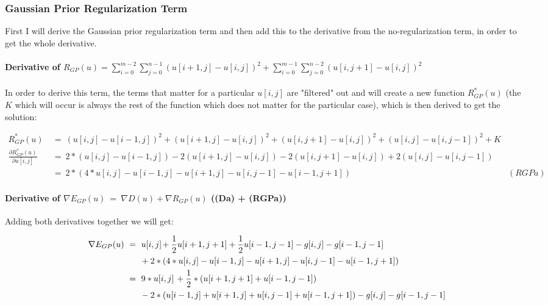 \documentclass{report}
\begin{document}
			\subsubsection{Gaussian Prior Regularization Term}
			\startsubsection
				First I will derive the Gaussian prior regularization term and then add this to the derivative from the no-regularization term, in order to get the whole derivative.
				\vspace{-0.4cm} \paragraph{Derivative of $R_{GP}(u) = \sum_{i=0}^{m-2} \sum_{j=0}^{n-1} ( u[i+1,j] - u[i,j] )^2 + \sum_{i=0}^{m-1} \sum_{j=0}^{n-2} ( u[i,j+1] - u[i,j] )^2$}
				\startsubsection
					\vspace{0.2cm} In order to derive this term, the terms that matter for a particular $u[i,j]$ are "filtered" out and will create a new function $R_{GP}^*(u)$ (the $K$ which will occur is always the rest of the function which does not matter for the particular case), which is then derived to get the solution:
				\closesection
				\begin{adjustwidth}{-4em}{}
					\vspace{-0.5cm}
					\begin{align*}
						R_{GP}^*(u) \ & = \ (u[i,j] - u[i-1,j])^2 + (u[i+1,j] - u[i,j])^2 + (u[i,j+1] - u[i,j])^2 + (u[i,j] - u[i,j-1])^2 + K \\
						\frac{\partial R_{GP}^*(u)}{\partial u[i,j]} \ & = \ 2 * (u[i,j] - u[i-1,j]) - 2 (u[i+1,j] - u[i,j]) - 2 (u[i,j+1] - u[i,j]) + 2 (u[i,j] - u[i,j-1]) \\
						& = \ 2 * (4 * u[i,j] - u[i-1,j] - u[i+1,j] - u[i,j-1] - u[i-1,j+1]) & (RGPa)
					\end{align*}
				\end{adjustwidth}
				\vspace{-0.4cm} \paragraph{Derivative of $\nabla E_{GP}(u) \ = \ \nabla D(u) + \nabla R_{GP}(u)$ ((Da) + (RGPa))}
				\startsubsection
					Adding both derivatives together we will get:
					\begin{adjustwidth}{-4em}{}
						\vspace{-0.5cm}
						\begin{align*}
							\nabla E_{GP}(u) \ & = \ u[i,j]  && \hspace{-0.9cm} + \frac{1}{2} u[i+1,j+1] + \frac{1}{2} u[i-1,j-1] - g[i,j] - g[i-1,j-1] \\
							&&& \hspace{-1.75cm} + 2 * (4 * u[i,j] - u[i-1,j] - u[i+1,j] - u[i,j-1] - u[i-1,j+1]) \\
							& = \ 9 * u[i,j] && \hspace{-0.3cm} + \frac{1}{2} * (u[i+1,j+1] + u[i-1,j-1]) \\
							&&& \hspace{-1.75cm} - 2 * (u[i-1,j] + u[i+1,j] + u[i,j-1] + u[i-1,j+1]) - g[i,j] - g[i-1,j-1]
						\end{align*}
					\end{adjustwidth}
				\closesection
			\closesection
\end{document}
